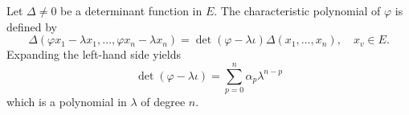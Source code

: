 Let $\Delta \neq 0$ be a determinant function in $E$. The characteristic polynomial of $\varphi$ is defined by
$$\Delta(\varphi x_1 - \lambda x_1, \ldots, \varphi x_n - \lambda x_n) = \det(\varphi - \lambda \iota) \Delta(x_1, \ldots, x_n), \quad x_v \in E.$$
Expanding the left-hand side yields
$$\det(\varphi - \lambda \iota) = \sum_{p=0}^{n} \alpha_p \lambda^{n-p}$$
which is a polynomial in $\lambda$ of degree $n$.
